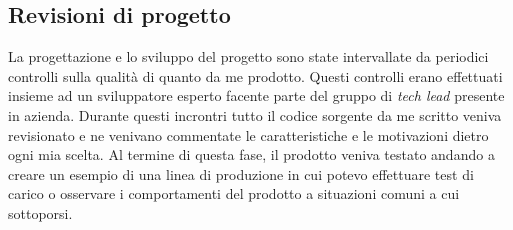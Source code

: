 \subsection{Revisioni di progetto}
\label{sub-sect:revisioni-progetto}
La progettazione e lo sviluppo del progetto sono state intervallate da periodici controlli sulla qualità di quanto da me prodotto. Questi controlli erano
effettuati insieme ad un sviluppatore esperto facente parte del gruppo di \emph{tech lead} presente in azienda. Durante questi incrontri tutto il codice sorgente
da me scritto veniva revisionato e ne venivano commentate le caratteristiche e le motivazioni dietro ogni mia scelta. Al termine di questa fase, il prodotto
veniva testato andando a creare un esempio di una linea di produzione in cui potevo effettuare test di carico o osservare i comportamenti del prodotto a
situazioni comuni a cui sottoporsi.

